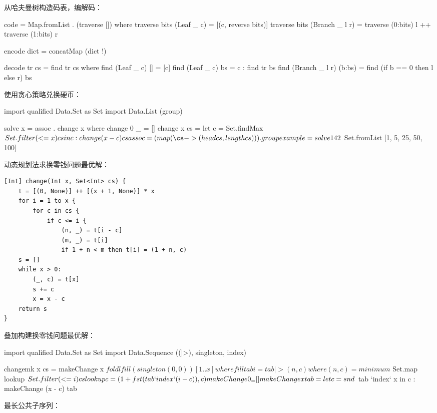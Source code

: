 \documentclass[b5paper]{ctexart}
\begin{document}
从哈夫曼树构造码表，编解码：

\begin{Haskell}
code = Map.fromList . (traverse []) where
  traverse bits (Leaf _ c) = [(c, reverse bits)]
  traverse bits (Branch _ l r) = traverse (0:bits) l ++ traverse (1:bits) r

encode dict = concatMap (dict !)

decode tr cs = find tr cs where
  find (Leaf _ c) [] = [c]
  find (Leaf _ c) bs = c : find tr bs
  find (Branch _ l r) (b:bs) = find (if b == 0 then l else r) bs
\end{Haskell} %

使用贪心策略兑换硬币：

\begin{Haskell}
import qualified Data.Set as Set
import Data.List (group)

solve x = assoc . change x where
  change 0 _ = []
  change x cs = let c = Set.findMax $ Set.filter (<= x) cs in c : change (x - c) cs
  assoc = (map (\cs -> (head cs, length cs))) . group

example = solve 142 $ Set.fromList [1, 5, 25, 50, 100]
\end{Haskell} %

动态规划法求换零钱问题最优解：

\begin{lstlisting}[language = Bourbaki]
[Int] change(Int x, Set<Int> cs) {
    t = [(0, None)] ++ [(x + 1, None)] * x
    for i = 1 to x {
        for c in cs {
            if c <= i {
                (n, _) = t[i - c]
                (m, _) = t[i]
                if 1 + n < m then t[i] = (1 + n, c)
    s = []
    while x > 0:
        (_, c) = t[x]
        s += c
        x = x - c
    return s
}
\end{lstlisting}

叠加构建换零钱问题最优解：

\begin{Haskell}
import qualified Data.Set as Set
import Data.Sequence ((|>), singleton, index)

changemk x cs = makeChange x $ foldl fill (singleton (0, 0)) [1..x] where
  fill tab i = tab |> (n, c) where
    (n, c) = minimum $ Set.map lookup $ Set.filter (<= i) cs
    lookup c  = (1 + fst (tab `index` (i - c)), c)
  makeChange 0 _ = []
  makeChange x tab = let c = snd $ tab `index` x in c : makeChange (x - c) tab
\end{Haskell} %

最长公共子序列：
\end{document}
